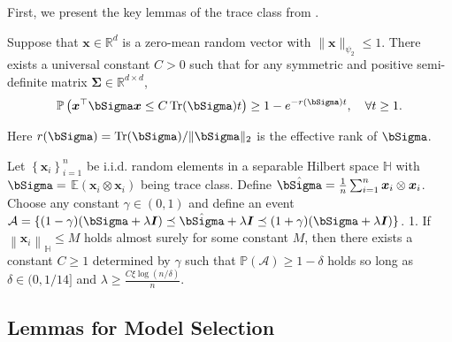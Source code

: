 \documentclass[12pt,a4paper,pdftex,onepage]{article}
\begin{document}
First, we present the key lemmas of the trace class from \citet*{wang2023pseudo}.
\begin{lemma}\label{lemma; quadratic martingale}
Suppose that $\boldsymbol{x} \in \mathbb{R}^d$ is a zero-mean random vector with $\|\boldsymbol{x}\|_{\psi_2} \leq 1$. There exists a universal constant $C>0$ such that for any symmetric and positive semi-definite matrix $\boldsymbol{\Sigma} \in \mathbb{R}^{d \times d}$,
\begin{align*}
\mathbb{P}\left(\boldsymbol{x}^{\top} \boldsymbol{\bSigma} \boldsymbol{x} \leq C \operatorname{Tr}(\boldsymbol{\bSigma}) t\right) \geq 1-e^{-r(\boldsymbol{\bSigma}) t}, \quad \forall t \geq 1 .
\end{align*}

Here $r(\boldsymbol{\bSigma})=\operatorname{Tr}(\boldsymbol{\bSigma}) /\|\boldsymbol{\bSigma}\|_2$ is the effective rank of $\boldsymbol{\bSigma}$.
\end{lemma}
\begin{lemma}\label{lemma; trace class concentration bounded}
Let $\left\{\boldsymbol{x}_i\right\}_{i=1}^n$ be i.i.d. random elements in a separable Hilbert space $\mathbb{H}$ with $\boldsymbol{\bSigma}=$ $\mathbb{E}\left(\boldsymbol{x}_i \otimes \boldsymbol{x}_i\right)$ being trace class. Define $\hat{\boldsymbol{\bSigma}}=\frac{1}{n} \sum_{i=1}^n \boldsymbol{x}_i \otimes \boldsymbol{x}_i$. Choose any constant $\gamma \in(0,1)$ and define an event $\mathcal{A}=\{(1-\gamma)(\boldsymbol{\bSigma}+\lambda \boldsymbol{I}) \preceq \hat{\boldsymbol{\bSigma}}+\lambda \boldsymbol{I} \preceq(1+\gamma)(\boldsymbol{\bSigma}+\lambda \boldsymbol{I})\}$.
1. If $\left\|\boldsymbol{x}_i\right\|_{\mathbb{H}} \leq M$ holds almost surely for some constant $M$, then there exists a constant $C \geq 1$ determined by $\gamma$ such that $\mathbb{P}(\mathcal{A}) \geq 1-\delta$ holds so long as $\delta \in(0,1 / 14]$ and $\lambda \geq \frac{C \xi \log (n / \delta)}{n}$.    
\end{lemma}


\subsection{Lemmas for Model Selection}
\end{document}
